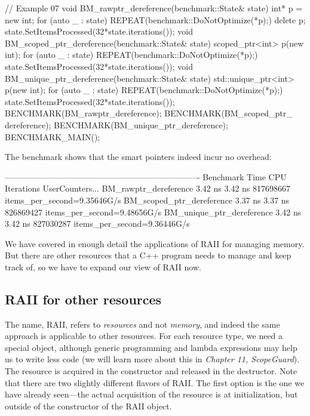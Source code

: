 \begin{code}
// Example 07
void BM_rawptr_dereference(benchmark::State& state) {
  int* p = new int;
  for (auto _ : state) {
    REPEAT(benchmark::DoNotOptimize(*p);)
  }
  delete p;
  state.SetItemsProcessed(32*state.iterations());
}
void BM_scoped_ptr_dereference(benchmark::State& state) {
  scoped_ptr<int> p(new int);
  for (auto _ : state) {
    REPEAT(benchmark::DoNotOptimize(*p);)
  }
  state.SetItemsProcessed(32*state.iterations());
}
void BM_unique_ptr_dereference(benchmark::State& state) {
  std::unique_ptr<int> p(new int);
  for (auto _ : state) {
     REPEAT(benchmark::DoNotOptimize(*p);)
  }
  state.SetItemsProcessed(32*state.iterations());
}
BENCHMARK(BM_rawptr_dereference);
BENCHMARK(BM_scoped_ptr_ dereference);
BENCHMARK(BM_unique_ptr_dereference);
BENCHMARK_MAIN();
\end{code}

The benchmark shows that the smart pointers indeed incur no overhead:

\begin{code}
----------------------------------------------------------------------
Benchmark                   Time        CPU Iterations UserCounters...
BM_rawptr_dereference      3.42 ns  3.42 ns  817698667 items_per_second=9.35646G/s
BM_scoped_ptr_dereference  3.37 ns  3.37 ns  826869427 items_per_second=9.48656G/s
BM_unique_ptr_dereference  3.42 ns  3.42 ns  827030287 items_per_second=9.36446G/s
\end{code}

We have covered in enough detail the applications of RAII for managing memory. But there are other resources that a C++ program needs to manage and keep track of, so we have to expand our view of RAII now.

\subsection{RAII for other resources}

The name, RAII, refers to \emph{resources} and not \emph{memory}, and indeed the same approach is applicable to other resources. For each resource type, we need a special object, although generic programming and lambda expressions may help us to write less code (we will learn more about this in \emph{Chapter 11, ScopeGuard}). The resource is acquired in the constructor and released in the destructor. Note that there are two slightly different flavors of RAII. The first option is the one we have already seen---the actual acquisition of the resource is at initialization, but outside of the constructor of the RAII object.

